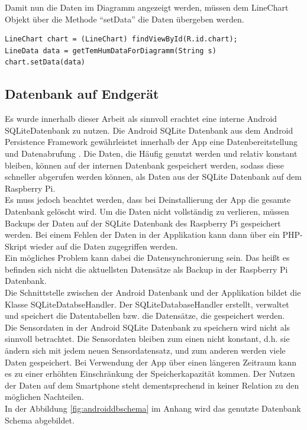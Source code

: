Damit nun die Daten im Diagramm angezeigt werden, müssen dem LineChart Objekt über die Methode \enquote{setData} die Daten übergeben werden. 
\begin{lstlisting}[label=list:showData]
LineChart chart = (LineChart) findViewById(R.id.chart);
LineData data = getTemHumDataForDiagramm(String s)
chart.setData(data)
\end{lstlisting}

\subsection{Datenbank auf Endgerät}
Es wurde innerhalb dieser Arbeit als sinnvoll erachtet eine interne Android SQLiteDatenbank zu nutzen.
Die Android SQLite Datenbank aus dem Android Persistence Framework gewährleistet innerhalb der App eine Datenbereitstellung und Datenabrufung \cite{ieee:androidpersistence}. Die Daten, die Häufig genutzt werden und relativ konstant bleiben, können auf der internen Datenbank gespeichert werden, sodass diese schneller abgerufen werden können, als Daten aus der SQLite Datenbank auf dem Raspberry Pi.\\
Es muss jedoch beachtet werden, dass bei Deinstallierung der App die gesamte Datenbank gelöscht wird. Um die Daten nicht vollständig zu verlieren, müssen Backups der Daten auf der SQLite Datenbank des Raspberry Pi gespeichert werden. Bei einem Fehlen der Daten in der Applikation kann dann über ein PHP-Skript wieder auf die Daten zugegriffen werden.\\ Ein mögliches Problem kann dabei die Datensynchronierung sein. Das heißt es befinden sich nicht die aktuellsten Datensätze als Backup in der Raspberry Pi Datenbank.\\
Die Schnittstelle zwischen der Android Datenbank und der Applikation bildet die Klasse SQLiteDatabseHandler. Der SQLiteDatabaseHandler erstellt, verwaltet und speichert die Datentabellen bzw. die Datensätze, die gespeichert werden.\\
Die Sensordaten in der Android SQLite Datenbank zu speichern wird nicht als sinnvoll betrachtet. Die Sensordaten bleiben zum einen nicht konstant, d.h. sie ändern sich mit jedem neuen Sensordatensatz, und zum anderen werden viele Daten gespeichert. Bei Verwendung der App über einen längeren Zeitraum kann es zu einer erhöhten Einschränkung der Speicherkapazität kommen. Der Nutzen der Daten auf dem Smartphone steht dementsprechend in keiner Relation zu den möglichen Nachteilen.\\
In der Abbildung \ref{fig:androiddbschema} im Anhang wird das genutzte Datenbank Schema abgebildet.\\

